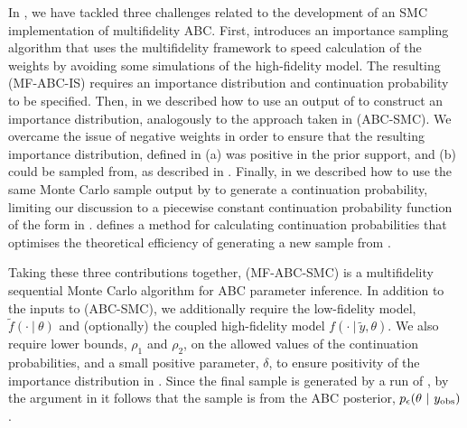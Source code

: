 \documentclass[review,demo]{siamonline190516}
\begin{document}
In , we have tackled three challenges related to the development of an SMC implementation of multifidelity ABC.
First,  introduces an importance sampling algorithm that uses the multifidelity framework to speed calculation of the weights by avoiding some simulations of the high-fidelity model.
The resulting  (MF-ABC-IS) requires an importance distribution and continuation probability to be specified.
Then, in  we described how to use an output of  to construct an importance distribution, analogously to the approach taken in  (ABC-SMC).
We overcame the issue of negative weights in order to ensure that the resulting importance distribution, defined in 
(a) was positive in the prior support,
and (b) could be sampled from, as described in .
Finally, in  we described how to use the same Monte Carlo sample output by  to generate a continuation probability, limiting our discussion to a piecewise constant continuation probability function of the form in .
 defines a method for calculating continuation probabilities that optimises the theoretical efficiency of generating a new sample from .

Taking these three contributions together,  (MF-ABC-SMC) is a multifidelity sequential Monte Carlo algorithm for ABC parameter inference.
In addition to the inputs to  (ABC-SMC), we additionally require the low-fidelity model, $\tilde f(\cdot~|~\theta)$ and (optionally) the coupled high-fidelity model $f(\cdot~|~\tilde y,\theta)$.
We also require lower bounds, $\rho_1$ and $\rho_2$, on the allowed values of the continuation probabilities, and a small positive parameter, $\delta$, to ensure positivity of the importance distribution in .
Since the final sample is generated by a run of , by the argument in  it follows that the sample is from the ABC posterior, $p_\epsilon(\theta~|~y_{\mathrm{obs}})$.
\end{document}
